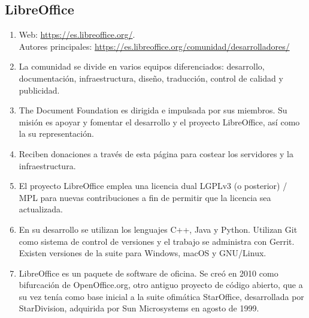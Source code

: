 \subsection{LibreOffice}
\begin{enumerate}
    \item Web: \url{https://es.libreoffice.org/}. \\Autores principales: \url{https://es.libreoffice.org/comunidad/desarrolladores/}
    \item La comunidad se divide en varios equipos diferenciados: desarrollo, documentación, infraestructura, diseño, traducción, control de calidad y publicidad. 
    \item The Document Foundation es dirigida e impulsada por sus miembros. Su misión es apoyar y fomentar el desarrollo y el proyecto LibreOffice, así como la su representación.
    \item Reciben donaciones a través de esta página para costear los servidores y la infraestructura.
    \item El proyecto LibreOffice emplea una licencia dual LGPLv3 (o posterior) / MPL para nuevas contribuciones a fin de permitir que la licencia sea actualizada.
    \item En su desarrollo se utilizan los lenguajes C++, Java y Python. Utilizan Git como sistema de control de versiones y el trabajo se administra con Gerrit. Existen versiones de la suite para Windows, macOS y GNU/Linux.
    \item LibreOffice es un paquete de software de oficina. Se creó en 2010 como bifurcación de OpenOffice.org, otro antiguo proyecto de código abierto, que a su vez tenía como base inicial a la suite ofimática StarOffice, desarrollada por StarDivision, adquirida por Sun Microsystems en agosto de 1999. 
\end{enumerate}

